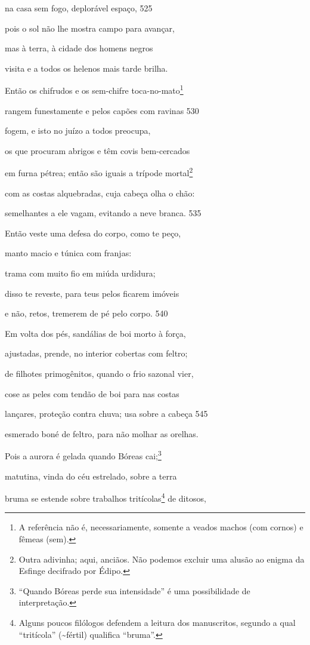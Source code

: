 na casa sem fogo, deplorável espaço, \num{525}

pois o sol não lhe mostra campo para avançar,

mas à terra, à cidade dos homens negros

visita e a todos os helenos mais tarde brilha.

Então os chifrudos e os sem-chifre toca-no-mato\footnote{A referência não é, necessariamente, somente a veados machos (com cornos) e fêmeas (sem).}

rangem funestamente e pelos capões com ravinas \num{530}

fogem, e isto no juízo a todos preocupa,

os que procuram abrigos e têm covis bem-cercados

em furna pétrea; então são iguais a trípode mortal\footnote{Outra adivinha; aqui, anciãos. Não podemos excluir uma alusão ao
enigma da Esfinge decifrado por Édipo.}

com as costas alquebradas, cuja cabeça olha o chão:

semelhantes a ele vagam, evitando a neve branca. \num{535}

Então veste uma defesa do corpo, como te peço,

manto macio e túnica com franjas:

trama com muito fio em miúda urdidura;

disso te reveste, para teus pelos ficarem imóveis

e não, retos, tremerem de pé pelo corpo. \num{540}

Em volta dos pés, sandálias de boi morto à força,

ajustadas, prende, no interior cobertas com feltro;

de filhotes primogênitos, quando o frio sazonal vier,

cose as peles com tendão de boi para nas costas

lançares, proteção contra chuva; usa sobre a cabeça \num{545}

esmerado boné de feltro, para não molhar as orelhas.

Pois a aurora é gelada quando Bóreas cai;\footnote{``Quando Bóreas perde sua intensidade'' é uma possibilidade de interpretação.}

matutina, vinda do céu estrelado, sobre a terra

bruma se estende sobre trabalhos tritícolas\footnote{Alguns poucos filólogos defendem a leitura dos manuscritos, segundo
a qual ``tritícola'' (\textasciitilde{}fértil) qualifica ``bruma''.} de ditosos,

